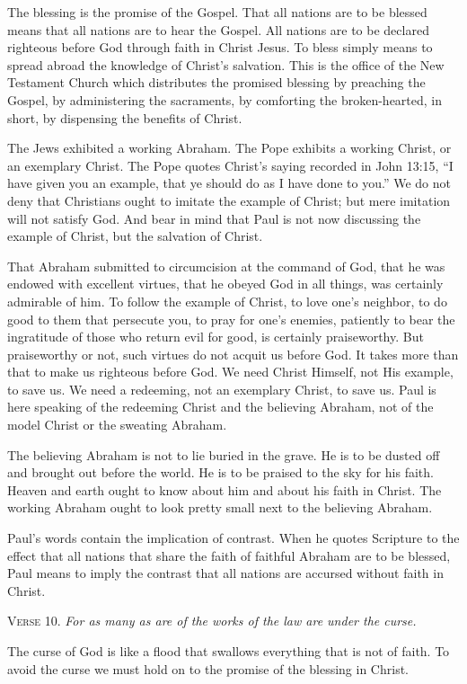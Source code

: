 The blessing is the promise of the Gospel. That all nations are to be blessed means that all nations are to hear the Gospel. All nations are to be declared righteous before God through faith in Christ Jesus. To bless simply means to spread abroad the knowledge of Christ’s salvation. This is the office of the New Testament Church which distributes the promised blessing by preaching the Gospel, by administering the sacraments, by comforting the broken-hearted, in short, by dispensing the benefits of Christ.

The Jews exhibited a working Abraham. The Pope exhibits a working Christ, or an exemplary Christ. The Pope quotes Christ’s saying recorded in John 13:15, “I have given you an example, that ye should do as I have done to you.” We do not deny that Christians ought to imitate the example of Christ; but mere imitation will not satisfy God. And bear in mind that Paul is not now discussing the example of Christ, but the salvation of Christ.

That Abraham submitted to circumcision at the command of God, that he was endowed with excellent virtues, that he obeyed God in all things, was certainly admirable of him. To follow the example of Christ, to love one’s neighbor, to do good to them that persecute you, to pray for one’s enemies, patiently to bear the ingratitude of those who return evil for good, is certainly praiseworthy. But praiseworthy or not, such virtues do not acquit us before God. It takes more than that to make us righteous before God. We need Christ Himself, not His example, to save us. We need a redeeming, not an exemplary Christ, to save us. Paul is here speaking of the redeeming Christ and the believing Abraham, not of the model Christ or the sweating Abraham.

The believing Abraham is not to lie buried in the grave. He is to be dusted off and brought out before the world. He is to be praised to the sky for his faith. Heaven and earth ought to know about him and about his faith in Christ. The working Abraham ought to look pretty small next to the believing Abraham.

Paul’s words contain the implication of contrast. When he quotes Scripture to the effect that all nations that share the faith of faithful Abraham are to be blessed, Paul means to imply the contrast that all nations are accursed without faith in Christ.

\textsc{Verse} 10. \emph{For as many as are of the works of the law are under the curse.}

The curse of God is like a flood that swallows everything that is not of faith. To avoid the curse we must hold on to the promise of the blessing in Christ.

